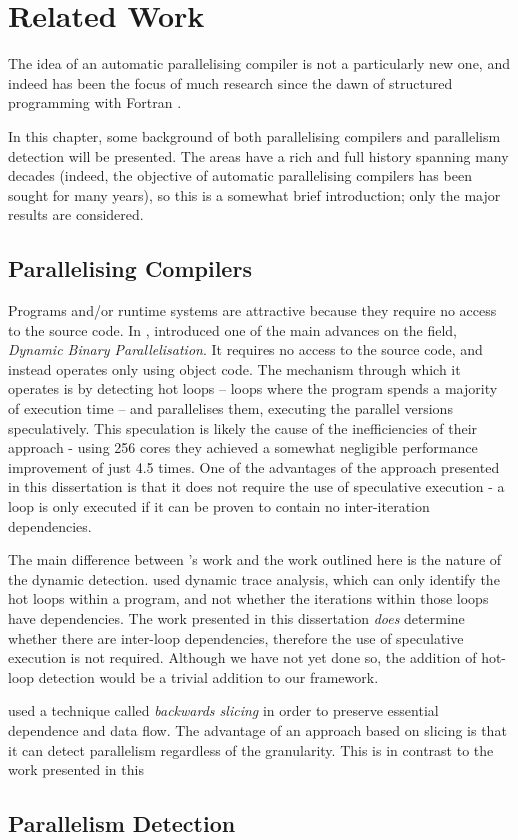 \chapter{Related Work} \label{chp:related}
The idea of an automatic parallelising compiler is not a particularly new one, and indeed has been the focus of much research since the dawn of structured programming with Fortran \citep{Backus1979}.

In this chapter, some background of both parallelising compilers and parallelism detection will be presented. The areas have a rich and full history spanning many decades (indeed, the objective of automatic parallelising compilers has been sought for many years), so this is a somewhat brief introduction; only the major results are considered.

\section{Parallelising Compilers} \label{sec:related/compilers}
	
Programs and/or runtime systems are attractive because they require no access to the source code. In \citeyear{Yang2011}, \citet{Yang2011} introduced one of the main advances on the field, \textit{Dynamic Binary Parallelisation}. It requires no access to the source code, and instead operates only using object code. The mechanism through which it operates is by detecting hot loops -- loops where the program spends a majority of execution time -- and parallelises them, executing the parallel versions speculatively. This speculation is likely the cause of the inefficiencies of their approach - using 256 cores they achieved a somewhat negligible performance improvement of just 4.5 times. One of the advantages of the approach presented in this dissertation is that it does not require the use of speculative execution - a loop is only executed if it can be proven to contain no inter-iteration dependencies.
	
The main difference between \citeauthor{Yang2011}'s work and the work outlined here is the nature of the dynamic detection. \citeauthor{Yang2011} used dynamic trace analysis, which can only identify the hot loops within a program, and not whether the iterations within those loops have dependencies. The work presented in this dissertation \emph{does} determine whether there are inter-loop dependencies, therefore the use of speculative execution is not required. Although we have not yet done so, the addition of hot-loop detection would be a trivial addition to our framework.

\citet{Wang2009} used a technique called \textit{backwards slicing} \citep{Weiser} in order to preserve essential dependence and data flow. The advantage of an approach based on slicing is that it can detect parallelism regardless of the granularity. This is in contrast to the work presented in this 

\citet{Ketterlin}

\citet{Dong}

\section{Parallelism Detection} \label{sec:related/detection}